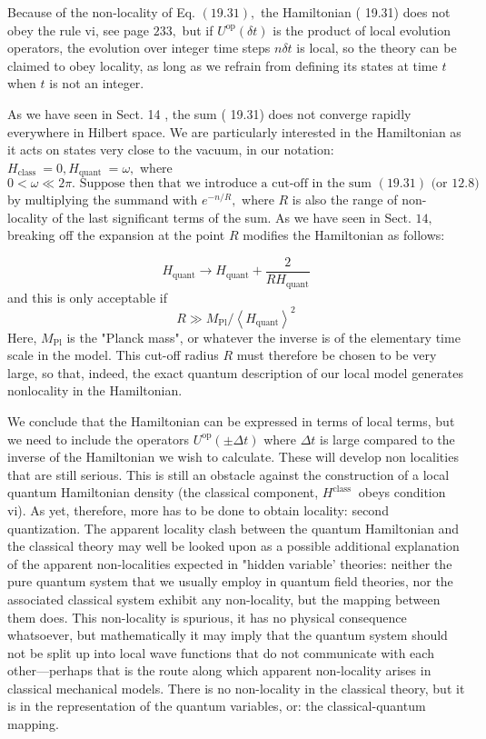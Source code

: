 \documentclass[main.tex]{subfiles}
\begin{document}
Because of the non-locality of Eq. $(19.31),$ the Hamiltonian ( 19.31) does not obey the rule vi, see page $233,$ but if $U^{\mathrm{op}}(\delta t)$ is the product of local evolution operators, the evolution over integer time steps $n \delta t$ is local, so the theory can be claimed to obey locality, as long as we refrain from defining its states at time $t$ when $t$ is not an integer.

As we have seen in Sect. 14 , the sum ( 19.31) does not converge rapidly everywhere in Hilbert space. We are particularly interested in the Hamiltonian as it acts on states very close to the vacuum, in our notation: $H_{\text {class }}=0, H_{\text {quant }}=\omega,$ where $0<\omega \ll 2 \pi . \text { Suppose then that we introduce a cut-off in the sum }(19.31) \text { (or } 12.8)$
by multiplying the summand with $e^{-n / R},$ where $R$ is also the range of non-locality of the last significant terms of the sum. As we have seen in Sect. $14,$ breaking off the expansion at the point $R$ modifies the Hamiltonian as follows:

$$
H_{\mathrm{quant}} \rightarrow H_{\mathrm{quant}}+\frac{2}{R H_{\mathrm{quant}}}
$$
and this is only acceptable if
$$
R \gg M_{\mathrm{Pl}} /\left\langle H_{\mathrm{quant}}\right\rangle^{2}
$$
Here, $M_{\mathrm{Pl}}$ is the "Planck mass", or whatever the inverse is of the elementary time scale in the model. This cut-off radius $R$ must therefore be chosen to be very large, so that, indeed, the exact quantum description of our local model generates nonlocality in the Hamiltonian.

We conclude that the Hamiltonian can be expressed in terms of local terms, but we need to include the operators $U^{\mathrm{op}}(\pm \Delta t)$ where $\Delta t$ is large compared to the inverse of the Hamiltonian we wish to calculate. These will develop non localities that are still serious. This is still an obstacle against the construction of a local quantum Hamiltonian density (the classical component, $H^{\text {class }}$ obeys condition vi).
As yet, therefore, more has to be done to obtain locality: second quantization. The apparent locality clash between the quantum Hamiltonian and the classical theory may well be looked upon as a possible additional explanation of the apparent non-localities expected in "hidden variable' theories: neither the pure quantum system that we usually employ in quantum field theories, nor the associated classical system exhibit any non-locality, but the mapping between them does. This non-locality is spurious, it has no physical consequence whatsoever, but mathematically it may imply that the quantum system should not be split up into local
wave functions that do not communicate with each other—perhaps that is the route
along which apparent non-locality arises in classical mechanical models. There is
no non-locality in the classical theory, but it is in the representation of the quantum
variables, or: the classical-quantum mapping.




\begin{equation}\label{19.}
	
\end{equation}
\end{document}
